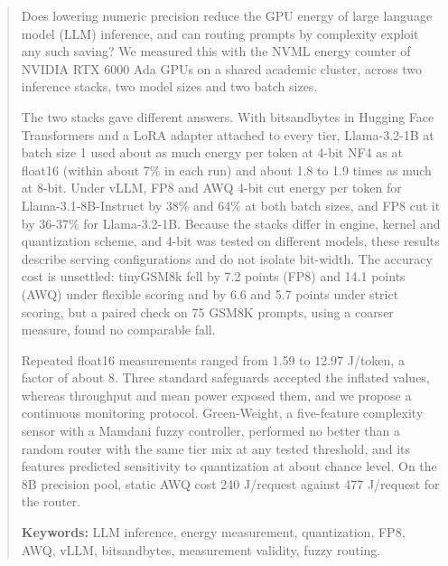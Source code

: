 \clearpage
\begin{abstract}
Does lowering numeric precision reduce the GPU energy of large language model (LLM) inference, and can routing prompts by complexity exploit any such saving? We measured this with the NVML energy counter of NVIDIA RTX 6000 Ada GPUs on a shared academic cluster, across two inference stacks, two model sizes and two batch sizes.

The two stacks gave different answers. With bitsandbytes in Hugging Face Transformers and a LoRA adapter attached to every tier, Llama-3.2-1B at batch size 1 used about as much energy per token at 4-bit NF4 as at float16 (within about 7\% in each run) and about 1.8 to 1.9 times as much at 8-bit. Under vLLM, FP8 and AWQ 4-bit cut energy per token for Llama-3.1-8B-Instruct by 38\% and 64\% at both batch sizes, and FP8 cut it by 36-37\% for Llama-3.2-1B. Because the stacks differ in engine, kernel and quantization scheme, and 4-bit was tested on different models, these results describe serving configurations and do not isolate bit-width. The accuracy cost is unsettled: tinyGSM8k fell by 7.2 points (FP8) and 14.1 points (AWQ) under flexible scoring and by 6.6 and 5.7 points under strict scoring, but a paired check on 75 GSM8K prompts, using a coarser measure, found no comparable fall.

Repeated float16 measurements ranged from 1.59 to 12.97 J/token, a factor of about 8. Three standard safeguards accepted the inflated values, whereas throughput and mean power exposed them, and we propose a continuous monitoring protocol. Green-Weight, a five-feature complexity sensor with a Mamdani fuzzy controller, performed no better than a random router with the same tier mix at any tested threshold, and its features predicted sensitivity to quantization at about chance level. On the 8B precision pool, static AWQ cost 240 J/request against 477 J/request for the router.

\textbf{Keywords:} LLM inference, energy measurement, quantization, FP8, AWQ, vLLM, bitsandbytes, measurement validity, fuzzy routing.

\end{abstract}
